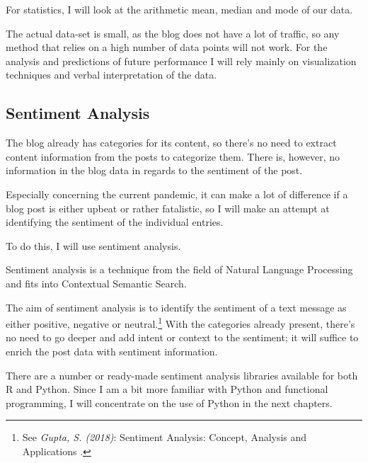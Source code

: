 For statistics, I will look at the arithmetic mean, median and mode of our data.

The actual data-set is small, as the blog does not have a lot of traffic, so any method that relies on a high number of data points will not work. For the analysis and predictions of future performance I will rely mainly on visualization techniques and verbal interpretation of the data.

\subsection{Sentiment Analysis}

The blog already has categories for its content, so there's no need to extract content information from the posts to categorize them. There is, however, no information in the blog data in regards to the sentiment of the post.

Especially concerning the current pandemic, it can make a lot of difference if a blog post is either upbeat or rather fatalistic, so I will make an attempt at identifying the sentiment of the individual entries.

To do this, I will use sentiment analysis. 

Sentiment analysis is a technique from the field of Natural Language Processing and fits into Contextual Semantic Search. 

The aim of sentiment analysis is to identify the sentiment of a text message as either positive, negative or neutral.\footnote{See \textit{Gupta, S. (2018)}: Sentiment Analysis: Concept, Analysis and Applications .\cite{sentimentAnalysis}} With the categories already present, there's no need to go deeper and add intent or context to the sentiment; it will suffice to enrich the post data with sentiment information.

There are a number or ready-made sentiment analysis libraries available for both R and Python. Since I am a bit more familiar with Python and functional programming, I will concentrate on the use of Python in the next chapters.
